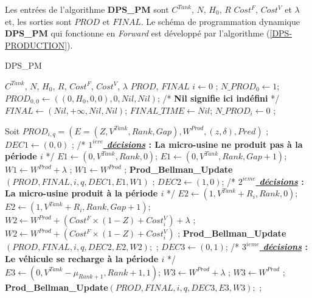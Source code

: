 Les entrées de l'algorithme \textbf{DPS\_PM} sont $C^{Tank}$, $N$, $H_0$, $R$ $Cost^F$, $Cost^V$ et $\lambda$ et, les sorties sont  $PROD$ et $FINAL$. Le schéma de programmation dynamique \textbf{DPS\_PM} qui fonctionne en \textit{Forward} est développé par l'algorithme (\ref{DPS-PRODUCTION}).
\begin{algorithm} 
	\caption{DPS\_PM}
	\label{DPS-PRODUCTION}
	\begin{algorithmic}[1]
		\REQUIRE $C^{Tank}$, $N$, $H_0$, $R$, $Cost^F$, $Cost^V$, $\lambda$
		\ENSURE $PROD$, $FINAL$
		\hline
		\vspace{0.5cm}
		\INITIALISATION
		\STATE $i \leftarrow 0$ ; $N\_PROD_0 \leftarrow 1$; $PROD_{0, 0} \leftarrow  ((0, H_0, 0, 0), 0, Nil, Nil)$; /* \textbf{Nil signifie ici indéfini} */
		\STATE $FINAL \leftarrow  (Nil, + \infty, Nil, Nil)$; $FINAL\_TIME \leftarrow Nil$; 
		\STATE $N\_PROD_i \leftarrow 0$ ;
		\ENDFOR
		
		\vspace{0.3cm}
		
		\BOUCLEPRINCIPAL
		\vspace{0.2cm}
		\STATE Soit $PROD_{i, q} = (E =  (Z, V^{Tank}, Rank, Gap),  W^{Prod}, (z, \delta), Pred)$ ;
		\STATE $DEC1 \leftarrow (0, 0)$ ; /* \textbf{\textit{\underline{$1^{iere}$ décisions}} : La micro-usine ne produit pas à la période $i$} */
		\STATE $E1 \leftarrow (0, V^{Tank}, Rank, 0)$; 
		\ELSE
		\STATE $E1 \leftarrow (0, V^{Tank}, Rank, Gap + 1)$; 
		\ENDIF
		\STATE $W1 \leftarrow W^{Prod} +\lambda$ ;
		\ELSE
		\STATE $W1 \leftarrow W^{Prod}$ ;  
		\ENDIF
		\STATE \textbf{Prod\_Bellman\_Update}$(PROD, FINAL, i, q, DEC1, E1, W1)$ ;
		\ENDIF
		\STATE $DEC2 \leftarrow (1, 0)$; /* \textbf{\textit{\underline{$2^{ieme}$ décisions}} : La micro-usine produit à la période $i$} */
		\STATE $E2 \leftarrow (1, V^{Tank}+ R_i, Rank, 0)$; 
		\ELSE
		\STATE $E2 \leftarrow (1, V^{Tank}+ R_i, Rank, Gap + 1)$; 
		\ENDIF
		\STATE $W2 \leftarrow W^{Prod} + (Cost^F \times (1-Z) + Cost^V_i) + \lambda$ ;
		\ELSE
		\STATE $W2 \leftarrow W^{Prod} + (Cost^F \times (1-Z) + Cost^V_i)$ ;  
		\ENDIF
		\STATE \textbf{Prod\_Bellman\_Update}$(PROD, FINAL, i, q, DEC2, E2, W2);$ ;
		\ENDIF
		\STATE $DEC3 \leftarrow (0, 1)$; /* \textbf{\textit{\underline{$3^{ieme}$ décisions}} : Le véhicule se recharge à la période $i$} */
		\STATE $E3 \leftarrow (0, V^{Tank}-\mu_{Rank+1}, Rank+1, 1)$; 
		\STATE $W3 \leftarrow W^{Prod}  + \lambda$ ;
		\ELSE
		\STATE $W3 \leftarrow W^{Prod}$ ;  
		\ENDIF
		\STATE \textbf{Prod\_Bellman\_Update}$(PROD, FINAL, i, q, DEC3, E3, W3);$ ;
		\ENDIF
		\ENDFOR
		\ENDFOR
	\end{algorithmic}
\end{algorithm}

